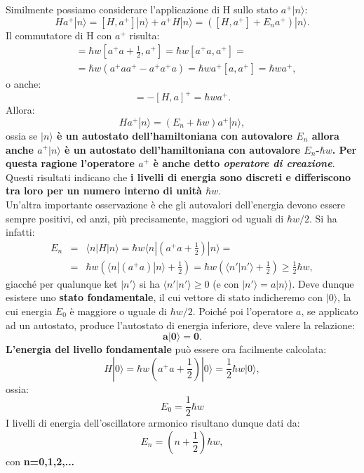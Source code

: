  Similmente possiamo considerare l'applicazione di H sullo stato $a^+|n\rangle$:
	\begin{equation}
		Ha^+|n\rangle= [H,a^+]|n\rangle+a^+H|n\rangle=([H,a^+]+E_na^+)|n\rangle.
	\end{equation}
Il commutatore di H con $a^+$ risulta:
	\begin{align}
		[H,a^+]&= \hbar w[a^+a+\frac{1}{2},a^+]=\hbar w [a^+a,a^+]= \nonumber\\
		&= \hbar w (a^+aa^+-a^+a^+a)=\hbar w a^+ [a,a^+]=\hbar wa^+,
	\end{align}
o anche:
\begin{equation}
[H,a^+]=-[H,a]^+=\hbar w a^+.
\end{equation}
Allora:
\begin{equation}
Ha^+|n\rangle=(E_n+\hbar w)a^+|n\rangle,
\end{equation}
ossia se \textbf{$|n\rangle$ è un autostato dell'hamiltoniana con autovalore $E_n$ allora anche $a^+|n\rangle$ è  un autostato dell'hamiltoniana con autovalore $E_n$-$\hbar w$. Per questa ragione l'operatore $a^+$ è anche detto \textit{operatore di creazione}}. \\ 
 Questi risultati indicano che \textbf{i livelli di energia sono discreti e differiscono tra loro per un numero interno di unità $\hbar w$}.\\
 Un'altra importante osservazione è che gli autovalori dell'energia devono essere sempre positivi, ed anzi, più precisamente, maggiori od uguali di $\hbar w/2$. Si ha infatti:
\begin{eqnarray}
	E_n&=&\langle n|H|n \rangle= \hbar w \langle n|(a^+a+\frac{1}{2})|n\rangle= \nonumber \\
	&=&\hbar w (\langle n|(a^+a)|n\rangle+\frac{1}{2})=\hbar w (\langle n'|n'\rangle+\frac{1}{2}) \geq \frac{1}{2} \hbar w, 
\end{eqnarray}
giacché per qualunque ket $|n'\rangle$ si ha $\langle n'|n' \rangle\geq 0$ (e con $|n'\rangle= a|n\rangle$).
Deve dunque esistere uno \textbf{stato fondamentale}, il cui vettore di stato indicheremo con $|0\rangle$, la cui energia $E_0$ è maggiore o uguale di $\hbar w/2$. Poiché poi l'operatore $a$, se applicato ad un autostato, produce l'autostato di energia inferiore, deve valere la relazione:
\begin{equation}  \label{eq:cap11_7}
\mathbf{a|0\rangle=0}.
\end{equation}
 \textbf{L'energia del livello fondamentale} può essere ora facilmente calcolata:
\begin{equation}
H|0\rangle= \hbar w(a^+a+\frac{1}{2})|0\rangle= \frac{1}{2} \hbar w |0\rangle,
\end{equation}
ossia:
\begin{equation}
E_0=\frac{1}{2} \hbar w
\end{equation}
 I livelli di energia dell'oscillatore armonico risultano dunque dati da:
\begin{equation}
  \label{eq:cap11_8}
E_n=(n+\frac{1}{2}) \hbar w ,
\end{equation}
con   \textbf{n=0,1,2,...}

